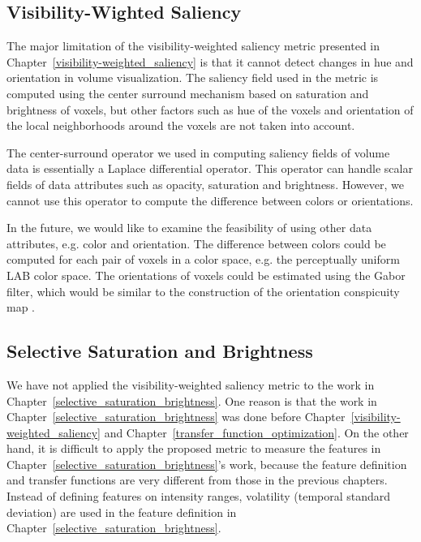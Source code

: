 \subsection{Visibility-Wighted Saliency}
The major limitation of the visibility-weighted saliency metric presented in Chapter~\ref{visibility-weighted_saliency} is that it cannot detect changes in hue and orientation in volume visualization. The saliency field used in the metric is computed using the center surround mechanism based on saturation and brightness of voxels, but other factors such as hue of the voxels and orientation of the local neighborhoods around the voxels are not taken into account.

The center-surround operator \cite{kim_saliency-guided_2006} we used in computing saliency fields of volume data is essentially a Laplace differential operator. This operator can handle scalar fields of data attributes such as opacity, saturation and brightness. However, we cannot use this operator to compute the difference between colors or orientations.

In the future, we would like to examine the feasibility of using other data attributes, e.g. color and orientation. The difference between colors could be computed for each pair of voxels in a color space, e.g. the perceptually uniform LAB color space. The orientations of voxels could be estimated using the Gabor filter, which would be similar to the construction of the orientation conspicuity map \cite{itti_model_1998}.

\subsection{Selective Saturation and Brightness}
We have not applied the visibility-weighted saliency metric to the work in Chapter~\ref{selective_saturation_brightness}. One reason is that the work in Chapter~\ref{selective_saturation_brightness} was done before Chapter~\ref{visibility-weighted_saliency} and Chapter~\ref{transfer_function_optimization}. On the other hand, it is difficult to apply the proposed metric to measure the features in Chapter~\ref{selective_saturation_brightness}'s work, because the feature definition and transfer functions are very different from those in the previous chapters. Instead of defining features on intensity ranges, volatility (temporal standard deviation) are used in the feature definition in Chapter~\ref{selective_saturation_brightness}.

